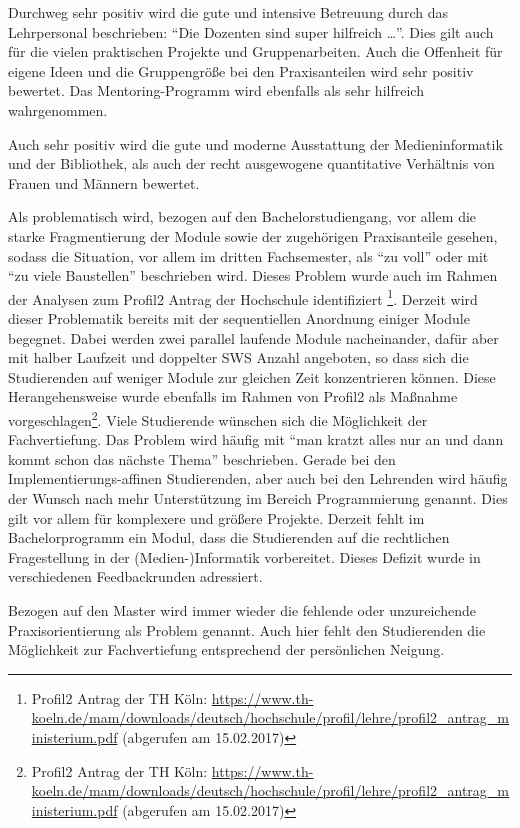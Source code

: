 Durchweg sehr positiv wird die gute und intensive Betreuung durch das
Lehrpersonal beschrieben: ``Die Dozenten sind super hilfreich
\ldots{}''. Dies gilt auch für die vielen praktischen Projekte und
Gruppenarbeiten. Auch die Offenheit für eigene Ideen und die
Gruppengröße bei den Praxisanteilen wird sehr positiv bewertet. Das
Mentoring-Programm wird ebenfalls als sehr hilfreich wahrgenommen.

Auch sehr positiv wird die gute und moderne Ausstattung der
Medieninformatik und der Bibliothek, als auch der recht ausgewogene
quantitative Verhältnis von Frauen und Männern bewertet.

Als problematisch wird, bezogen auf den Bachelorstudiengang, vor allem
die starke Fragmentierung der Module sowie der zugehörigen Praxisanteile
gesehen, sodass die Situation, vor allem im dritten Fachsemester, als
``zu voll'' oder mit ``zu viele Baustellen'' beschrieben wird. Dieses
Problem wurde auch im Rahmen der Analysen zum Profil2 Antrag der
Hochschule identifiziert \footnote{Profil2 Antrag der TH Köln:
  \url{https://www.th-koeln.de/mam/downloads/deutsch/hochschule/profil/lehre/profil2\_antrag\_ministerium.pdf}
  (abgerufen am 15.02.2017)}. Derzeit wird dieser Problematik bereits
mit der sequentiellen Anordnung einiger Module begegnet. Dabei werden
zwei parallel laufende Module nacheinander, dafür aber mit halber
Laufzeit und doppelter SWS Anzahl angeboten, so dass sich die
Studierenden auf weniger Module zur gleichen Zeit konzentrieren können.
Diese Herangehensweise wurde ebenfalls im Rahmen von Profil2 als
Maßnahme vorgeschlagen\footnote{Profil2 Antrag der TH Köln:
  \url{https://www.th-koeln.de/mam/downloads/deutsch/hochschule/profil/lehre/profil2\_antrag\_ministerium.pdf}
  (abgerufen am 15.02.2017)}. Viele Studierende wünschen sich die
Möglichkeit der Fachvertiefung. Das Problem wird häufig mit ``man kratzt
alles nur an und dann kommt schon das nächste Thema'' beschrieben.
Gerade bei den Implementierungs-affinen Studierenden, aber auch bei den
Lehrenden wird häufig der Wunsch nach mehr Unterstützung im Bereich
Programmierung genannt. Dies gilt vor allem für komplexere und größere
Projekte. Derzeit fehlt im Bachelorprogramm ein Modul, dass die
Studierenden auf die rechtlichen Fragestellung in der
(Medien-)Informatik vorbereitet. Dieses Defizit wurde in verschiedenen
Feedbackrunden adressiert.

Bezogen auf den Master wird immer wieder die fehlende oder unzureichende
Praxisorientierung als Problem genannt. Auch hier fehlt den Studierenden
die Möglichkeit zur Fachvertiefung entsprechend der persönlichen
Neigung.

